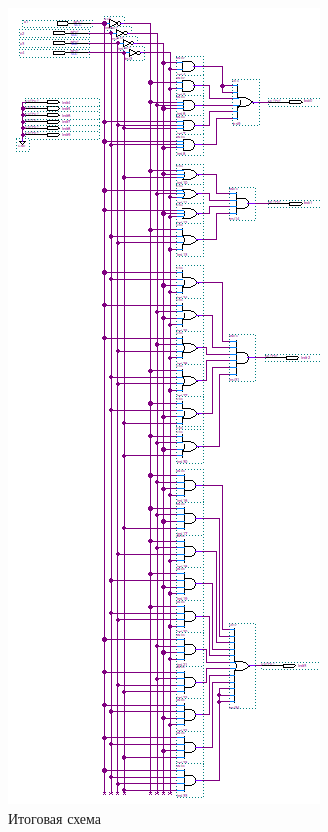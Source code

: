\documentclass[a4paper,14pt]{article}
\begin{document}
\begin{figure}[H]
	\centering
	\includegraphics[width=0.5\linewidth]{image/02_all}
	\caption{Итоговая схема}
	\label{fig:02all}
\end{figure}
\end{document}
